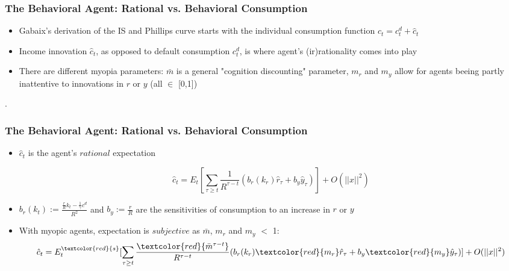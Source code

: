 \documentclass{beamer}
\begin{document}

\begin{frame}
	\frametitle{The Behavioral Agent: Rational vs. Behavioral Consumption}
	\begin{itemize}
		\item Gabaix's derivation of the IS and Phillips curve starts with the individual consumption function $c_{t}=c_{t}^{d}+\hat c_{t}$
		\item  Income innovation $\hat c_{t}$, as opposed to default consumption $c_{t}^{d}$, is where agent's (ir)rationality comes into play
		\item There are different myopia parameters: $\bar m$ is a general "cognition discounting" parameter, $m_{r}$ and $m_{y}$ allow for agents beeing partly inattentive to innovations in $r$ or $y$ (all $\in$ [0,1])
	\end{itemize}.
\end{frame}


\begin{frame}
	\frametitle{The Behavioral Agent: Rational vs. Behavioral Consumption}
	\begin{itemize}
		\item $\hat c_{t}$ is the agent's $rational$ expectation 

		$$\hat c_{t}=E_{t}[\sum_{\tau \geq t}\frac{1}{R^{\tau-t}}(b_{r}(k_{r})\hat r_{\tau}+b_{y}\hat y_{\tau})]+O(||x||^2)$$
		\item  $b_{r}(k_{t}):=\frac {\frac {r}{R}k_{t}-\frac {1}{\gamma}c^{d}}{R^{2}}$ and $b_{y}:=\frac {r}{R}$ are the sensitivities of consumption to an increase in $r$ or $y$
		\item With myopic agents, expectation is $subjective$ as $\bar m$, $m_{r}$ and $m_{y}$  $<$ 1: $$\hat c_{t}=E_{t}^{\textcolor{red}{s}}[\sum_{\tau \geq t}\frac{\textcolor{red}{\bar m^{\tau-t}}}{R^{\tau-t}}(b_{r}(k_{r})\textcolor{red}{m_{r}}\hat r_{\tau}+b_{y}\textcolor{red}{m_{y}}\hat y_{\tau})]+O(||x||^2)$$
	\end{itemize}
\end{frame}

\end{document}
